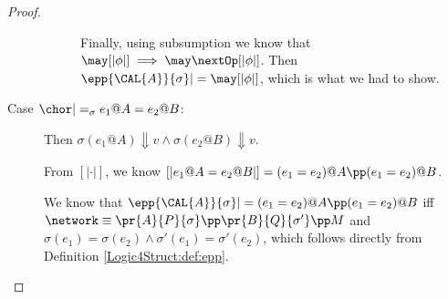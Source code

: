 \begin{proof}
\begin{description}
\begin{description}
  Finally, using subsumption we know that $\may [| \phi |] \implies
  \may \nextOp  [| \phi |]$. Then $ \epp{\CAL{A}}{\sigma} |= \may [| \phi |]$, which is what
  we had to show.
  \end{description}


  \item[Case $\chor |=_\sigma e_1@A = e_2@B$:] Then $\sigma(e_1@A) \Downarrow v \land
    \sigma(e_2@B) \Downarrow v$. 

    From $[| \cdot |]$, we know $[| e_1@A = e_2@B |] = (e_1 = e_2)@A
    \pp (e_1 = e_2)@B$.

    We know that $\epp{\CAL{A}}{\sigma} |= (e_1 = e_2)@A
    \pp (e_1 = e_2)@B$ iff $\network \equiv \pr{A}{P}{\sigma} \pp
    \pr{B}{Q}{\sigma'} \pp M$ and $ \sigma(e_1) = \sigma(e_2) \land
    \sigma'(e_1) = \sigma'(e_2)$, which follows directly from 
    Definition \ref{Logic4Struct:def:epp}.

\end{description}

\end{proof} 



